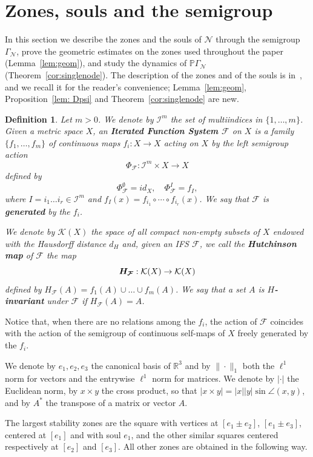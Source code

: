 \documentclass[11pt]{amsart}
\newtheorem{definition}[proposition]{Definition}
\theoremstyle{definition}
\theoremstyle{remark}
\newcommand{\R}{\mathbb R}
\newcommand{\cN}{\mathcal N}
\newcommand{\cI}{\mathcal I}
\newcommand{\cF}{\mathcal F}
\newcommand{\GN}{\Gamma_{\mathcal N}}
\newcommand{\PGN}{{\mathbb P}\Gamma_{\mathcal N}}
\newcommand{\abs}[1]{\lvert #1\rvert}
\begin{document}
\section{Zones, souls and the semigroup}\label{sec:souls}

In this section we describe the zones and the souls of $\cN$ through the semigroup $\GN$, prove the geometric estimates on the zones used throughout the paper (Lemma~\ref{lem:geom}), and study the dynamics of $\PGN$ (Theorem~\ref{cor:singlenode}).
The description of the zones and of the souls is in~\cite{DD09,DL08,DL15EM}, and we recall it for the reader's convenience; Lemma~\ref{lem:geom}, Proposition~\ref{lem: Dpsi} and Theorem~\ref{cor:singlenode} are new.

\begin{definition}
    Let $m>0$. 
    We denote by $\cI^m$ the set of multiindices in $\{1,\dots,m\}$.
    Given a metric space $X$, an {\bf Iterated Function System \boldmath $\cF$} on $X$ is a family $\{f_1,\dots,f_m\}$ of continuous maps $f_i:X\to X$ acting on $X$ by the left semigroup action
    \[
    \Phi_\cF:\cI^m\times X\to X
    \]
    defined by 
    \[
    \Phi^\emptyset_\cF=id_X,\quad\Phi_\cF^I=f_I,
    \]
    where $I=i_1\dots i_r\in\cI^m$ and $f_I(x)=f_{i_1}\circ\cdots\circ f_{i_r}(x)$.
    We say that $\cF$ is {\bf generated} by the $f_i$.

    We denote by {\boldmath$\mathcal K(X)$} the space of all compact non-empty subsets of $X$ endowed with the Hausdorff distance {\boldmath$d_H$} and, given an IFS $\cF$, we call the {\bf Hutchinson map} of $\cF$ the map
    \[
    \text{\boldmath$H_\cF$}:\mathcal K(X)\to\mathcal K(X)
    \] 
    defined by $H_\cF(A)=f_1(A)\cup\dots\cup f_m(A)$.
    We say that a set $A$ is {\bf\boldmath $H$-invariant} under $\cF$ if $H_\cF(A)=A$.
\end{definition}
Notice that, when there are no relations among the $f_i$, the action of $\cF$ coincides with the action of the semigroup of continuous self-maps of $X$ freely generated by the $f_i$.

\medskip
We denote by $e_1,e_2,e_3$ the canonical basis of $\R^3$ and by $\|\cdot\|_1$ both the $\ell^1$ norm for vectors and the entrywise $\ell^1$ norm for matrices.
We denote by $\abs{\cdot}$ the Euclidean norm, by $x\times y$ the cross product, so that $\abs{x\times y}=\abs x\abs y\sin\angle(x,y)$, and by $A^*$ the transpose of a matrix or vector $A$.

The largest stability zones are the square with vertices at $[e_1\pm e_2]$, $[e_1\pm e_3]$, centered at $[e_1]$ and with soul $e_1$, and the other similar squares centered respectively at $[e_2]$ and $[e_3]$.
All other zones are obtained in the following way.
\end{document}
